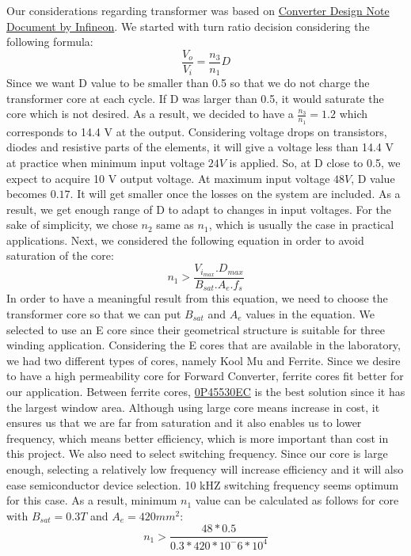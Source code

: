 \documentclass{article}
\newcommand\tab[1][1cm]{\hspace*{#1}}
\begin{document}
\tab Our considerations regarding transformer was based on \href{https://www.mouser.com/pdfdocs/2-10.pdf}{Converter Design Note Document by Infineon}. We started with turn ratio decision considering the following formula:
\begin{equation}
    \frac{V_o}{V_i}=\frac{n_3}{n_1}D
\end{equation}
\tab Since we want D value to be smaller than 0.5 so that we do not charge the transformer core at each cycle. If D was larger than 0.5, it would saturate the core which is not desired.
\newline \tab As a result, we decided to have a $\frac{n_3}{n_1}=1.2$ which corresponds to 14.4 V at the output. Considering voltage drops on transistors, diodes and resistive parts of the elements, it will give a voltage less than 14.4 V at practice when minimum input voltage $24 V$ is applied. So, at D close to 0.5, we expect to acquire 10 V output voltage. At maximum input voltage $48 V$, D value becomes $0.17$. It will get smaller once the losses on the system are included. As a result, we get enough range of D to adapt to changes in input voltages. For the sake of simplicity, we chose $n_2$ same as $n_1$, which is usually the case in practical applications.
\newline \tab Next, we considered the following equation in order to avoid saturation of the core:
\begin{equation}
    n_1>\frac{V_{i_{max}}.D_{max}}{B_{sat}.A_e.f_s}
\end{equation}
\tab In order to have a meaningful result from this equation, we need to choose the transformer core so that we can put $B_{sat}$ and $A_e$ values in the equation. We selected to use an E core since their geometrical structure is suitable for three winding application. Considering the E cores that are available in the laboratory, we had two different types of cores, namely Kool Mu and Ferrite. Since we desire to have a high permeability core for Forward Converter, ferrite cores fit better for our application. Between ferrite cores, \href{https://www.mag-inc.com/Media/Magnetics/Datasheets/0P45530EC.pdf}{0P45530EC} is the best solution since it has the largest window area. Although using large core means increase in cost, it ensures us that we are far from saturation and it also enables us to lower frequency, which means better efficiency, which is more important than cost in this project. We also need to select switching frequency. Since our core is large enough, selecting a relatively low frequency will increase efficiency and it will also ease semiconductor device selection. 10 kHZ switching frequency seems optimum for this case. As a result, minimum $n_1$ value can be calculated as follows for core with $B_{sat}=0.3 T $ and $A_e=420 mm^2$:
\begin{equation}
    n_1>\frac{48*0.5}{0.3*420*10^-6*10^4}
\end{equation}
\end{document}
